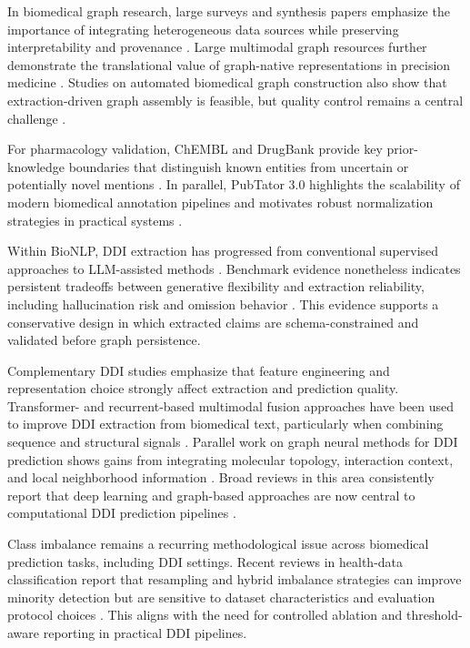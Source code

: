 \documentclass[conference]{Template/IEEEtran}
\begin{document}
In biomedical graph research, large surveys and synthesis papers emphasize the importance of integrating heterogeneous data sources while preserving interpretability and provenance \cite{hansel2023kg,lu2025bkgsurvey}. Large multimodal graph resources further demonstrate the translational value of graph-native representations in precision medicine \cite{chandak2023primekg}. Studies on automated biomedical graph construction also show that extraction-driven graph assembly is feasible, but quality control remains a central challenge \cite{schafer2024biokgrapher}.

For pharmacology validation, ChEMBL and DrugBank provide key prior-knowledge boundaries that distinguish known entities from uncertain or potentially novel mentions \cite{zdravil2024chembl,wishart2018drugbank}. In parallel, PubTator 3.0 highlights the scalability of modern biomedical annotation pipelines and motivates robust normalization strategies in practical systems \cite{wei2024pubtator}.

Within BioNLP, DDI extraction has progressed from conventional supervised approaches to LLM-assisted methods \cite{luo2022biogpt,machado2023ddi,zhou2024highthroughput}. Benchmark evidence nonetheless indicates persistent tradeoffs between generative flexibility and extraction reliability, including hallucination risk and omission behavior \cite{chen2025benchmark}. This evidence supports a conservative design in which extracted claims are schema-constrained and validated before graph persistence.

Complementary DDI studies emphasize that feature engineering and representation choice strongly affect extraction and prediction quality. Transformer- and recurrent-based multimodal fusion approaches have been used to improve DDI extraction from biomedical text, particularly when combining sequence and structural signals \cite{yu2024biggt}. Parallel work on graph neural methods for DDI prediction shows gains from integrating molecular topology, interaction context, and local neighborhood information \cite{mffgnn2022,gnnddi2022,knowddi2024,gnnworkshop2024}. Broad reviews in this area consistently report that deep learning and graph-based approaches are now central to computational DDI prediction pipelines \cite{luo2024iscience,li2024quantbio}.

Class imbalance remains a recurring methodological issue across biomedical prediction tasks, including DDI settings. Recent reviews in health-data classification report that resampling and hybrid imbalance strategies can improve minority detection but are sensitive to dataset characteristics and evaluation protocol choices \cite{hairani2024smote,medimbalance2024,agyemang2025imbalance}. This aligns with the need for controlled ablation and threshold-aware reporting in practical DDI pipelines.
\end{document}

